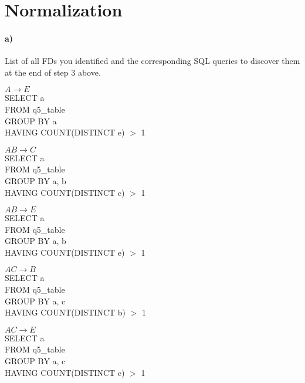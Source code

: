 \documentclass[a4paper,12pt]{article}
\begin{document}
\newpage
\section{Normalization}

\paragraph{a) } List of all FDs you identified and the corresponding SQL queries to discover them at the end of step 3 above. \\

\begin{tcolorbox}
$A \to E$ \\

SELECT a\\
FROM q5\_table\\ 
GROUP BY a\\
HAVING COUNT(DISTINCT e) $>$ 1 \\
\end{tcolorbox}

\begin{tcolorbox}
$AB \to C$ \\

SELECT a\\
FROM q5\_table\\ 
GROUP BY a, b\\
HAVING COUNT(DISTINCT c) $>$ 1 \\
\end{tcolorbox}

\begin{tcolorbox}
$AB \to E$ \\

SELECT a\\
FROM q5\_table\\ 
GROUP BY a, b\\
HAVING COUNT(DISTINCT e) $>$ 1 \\
\end{tcolorbox}

\begin{tcolorbox}
$AC \to B$ \\

SELECT a\\
FROM q5\_table\\ 
GROUP BY a, c\\
HAVING COUNT(DISTINCT b) $>$ 1 \\
\end{tcolorbox}

\begin{tcolorbox}
$AC \to E$ \\

SELECT a\\
FROM q5\_table\\ 
GROUP BY a, c\\
HAVING COUNT(DISTINCT e) $>$ 1 \\
\end{tcolorbox}
\end{document}
